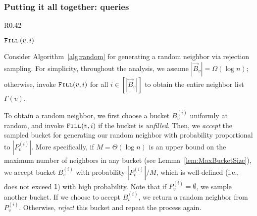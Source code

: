 \subsubsection{Putting it all together:  queries}
\label{sec:random_neighbor}
\begin{wrapfigure}[11]{R}{0.42\textwidth}
\vspace{-1.2em}
\begin{framed}
    \renewcommand\figurename{Algorithm}
    \caption{Bucketing Generator}
    \label{alg:random}
    \begin{algorithmic}
                    \State$\texttt{\textsc{Fill}}\left( v,i\right)$
                \EndIf
            \EndWhile
        \EndProcedure
    \end{algorithmic}
\end{framed}
\end{wrapfigure}

Consider Algorithm~\ref{alg:random} for generating a random neighbor via rejection sampling.
For simplicity, throughout the analysis, we assume $|\vec B_v| = \Omega(\log n)$;
otherwise, invoke $\texttt{\textsc{Fill}}(v,i)$ for all $i \in [|\vec B_v|]$ to obtain the entire neighbor list $\Gamma(v)$.

To obtain a random neighbor, we first choose a bucket $B^{(i)}_v$ uniformly at random, and invoke $\texttt{\textsc{Fill}}(v,i)$ if the bucket is \emph{unfilled}.
Then, we \emph{accept} the sampled bucket for generating our random neighbor with probability proportional to $|P_v^{(i)}|$.
More specifically, if $M = \Theta(\log n)$ is an upper bound on the maximum number of neighbors in any bucket (see Lemma~\ref{lem:MaxBucketSize}),
we accept bucket $B^{(i)}_v$ with probability $|P_v^{(i)}|/M$, which is well-defined (i.e., does not exceed $1$) with high probability.
Note that if $P_v^{(i)} = \emptyset$, we sample another bucket.
If we choose to accept $B^{(i)}_v$, we return a random neighbor from $P_v^{(i)}$.
Otherwise, \emph{reject} this bucket and repeat the process again.

